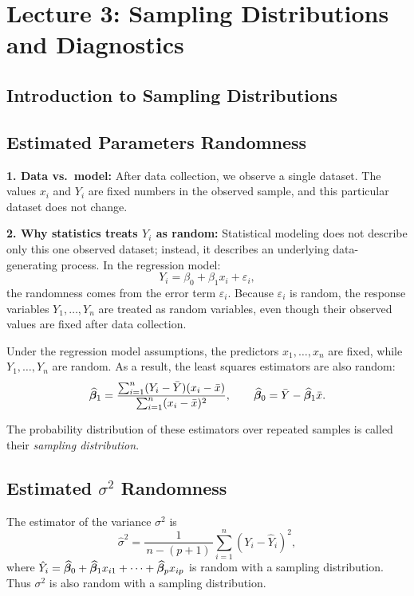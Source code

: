 \section{Lecture 3: Sampling Distributions and Diagnostics}

\subsection{Introduction to Sampling Distributions}

\subsection{Estimated Parameters Randomness}

\textbf{1. Data vs.\ model:} After data collection, we observe a single dataset. The values $x_i$ and $Y_i$ are fixed numbers in the observed sample, and this particular dataset does not change.

\textbf{2. Why statistics treats $Y_i$ as random:} Statistical modeling does not describe only this one observed dataset; instead, it describes an underlying data-generating process. In the regression model:
\[
Y_i = \beta_0 + \beta_1 x_i + \varepsilon_i,
\]
the randomness comes from the error term $\varepsilon_i$. Because $\varepsilon_i$ is random, the response variables $Y_1, \ldots, Y_n$ are treated as random variables, even though their observed values are fixed after data collection.

Under the regression model assumptions, the predictors $x_1, \ldots, x_n$ are fixed, while $Y_1, \ldots, Y_n$ are random. As a result, the least squares estimators are also random:
\[
\widehat{\boldsymbol{\beta}}_1
=
\frac{\sum_{i=1}^n (Y_i - \bar{Y})(x_i - \bar{x})}
{\sum_{i=1}^n (x_i - \bar{x})^2},
\qquad
\widehat{\boldsymbol{\beta}}_0 = \bar{Y} - \widehat{\boldsymbol{\beta}}_1 \bar{x}.
\]

The probability distribution of these estimators over repeated samples is called their \emph{sampling distribution}.

\subsection{Estimated $\sigma^2$ Randomness}

The estimator of the variance $\sigma^2$ is
\[
\hat{\sigma}^2
=
\frac{1}{\,n-(p+1)\,}
\sum_{i=1}^n \left( Y_i - \hat{Y}_i \right)^2,
\]
where $\hat{Y}_i = \widehat{\boldsymbol{\beta}}_0 + \widehat{\boldsymbol{\beta}}_1 x_{i1} + \cdots + \widehat{\boldsymbol{\beta}}_p x_{ip}$ is random with a sampling distribution. Thus $\sigma^2$ is also random with a sampling distribution.

